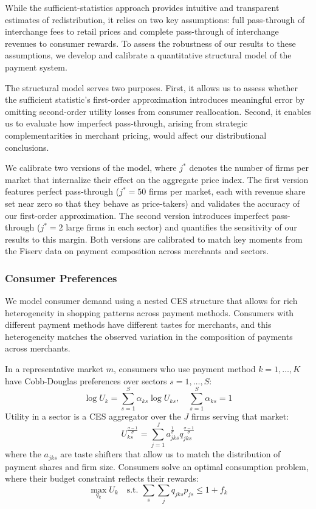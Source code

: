 \documentclass[main.tex]{subfiles}
\begin{document}
While the sufficient-statistics approach provides intuitive and transparent estimates of redistribution, it relies on two key assumptions: full pass-through of interchange fees to retail prices and complete pass-through of interchange revenues to consumer rewards.
To assess the robustness of our results to these assumptions, we develop and calibrate a quantitative structural model of the payment system.

The structural model serves two purposes.
First, it allows us to assess whether the sufficient statistic's first-order approximation introduces meaningful error by omitting second-order utility losses from consumer reallocation.
Second, it enables us to evaluate how imperfect pass-through, arising from strategic complementarities in merchant pricing, would affect our distributional conclusions.

We calibrate two versions of the model, where $j^*$ denotes the number of firms per market that internalize their effect on the aggregate price index.
The first version features perfect pass-through ($j^*=50$ firms per market, each with revenue share set near zero so that they behave as price-takers) and validates the accuracy of our first-order approximation.
The second version introduces imperfect pass-through ($j^*=2$ large firms in each sector) and quantifies the sensitivity of our results to this margin.
Both versions are calibrated to match key moments from the Fiserv data on payment composition across merchants and sectors.

\subsubsection{Consumer Preferences}

We model consumer demand using a nested CES structure that allows for rich heterogeneity in shopping patterns across payment methods.
Consumers with different payment methods have different tastes for merchants, and this heterogeneity matches the observed variation in the composition of payments across merchants.

In a representative market $m$, consumers who use payment method $k=1,\dots,K$ have Cobb-Douglas preferences over sectors $s=1,\dots,S$:
\[
\log U_{k}=\sum_{s=1}^{S}\alpha_{ks}\log U_{ks},\quad\sum_{s=1}^{S}\alpha_{ks}=1
\]
Utility in a sector is a CES aggregator over the $J$ firms serving that market:
\[
U_{ks}^{\frac{\sigma-1}{\sigma}}=\sum_{j=1}^{J}a_{jks}^{\frac{1}{\sigma}}q_{jks}^{\frac{\sigma-1}{\sigma}}
\]
where the $a_{jks}$ are taste shifters that allow us to match the distribution of payment shares and firm size. Consumers solve an optimal consumption problem, where their budget constraint reflects their rewards:
\begin{equation}
\max_{q_{k}}U_{k}\quad\text{s.t. }\sum_{s}\sum_{j}q_{jks}p_{js}\leq1+f_{k} \label{eq:consumption-problem}
\end{equation}
\end{document}
